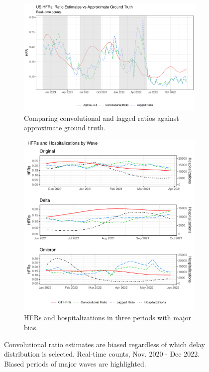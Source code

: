 \documentclass{article}
\begin{document}
\begin{figure}
     \centering
     \begin{subfigure}[b]{0.55\linewidth}
         \centering
         \includegraphics[width=\linewidth]{Figs/Real/US_ests_realtime.pdf}
         \caption{Comparing convolutional and lagged ratios against approximate ground truth.}
         \label{fig:basic_est_vs_gt}
     \end{subfigure}
     \hfill
     \begin{subfigure}[b]{0.4\linewidth}
         \centering
         \includegraphics[width=\linewidth]{Figs/Real/hfrs_by_wave.pdf}
         \caption{HFRs and hospitalizations in three periods with major bias.} 
         \label{fig:wave}
     \end{subfigure}
        \caption{Convolutional ratio estimates are biased regardless of which delay distribution is selected. Real-time counts, Nov. 2020 - Dec 2022. Biased periods of major waves are highlighted.}
        \label{fig:basic_est_vs_gt_figs}
\end{figure}
\end{document}
